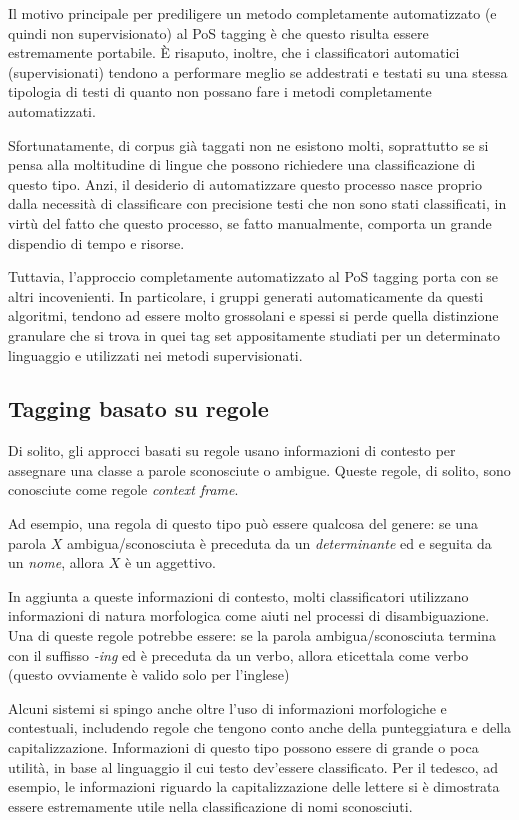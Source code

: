 Il motivo principale per prediligere un metodo completamente automatizzato (e quindi non supervisionato) al PoS tagging \`e che questo risulta essere estremamente portabile.
\`E risaputo, inoltre, che i classificatori automatici (supervisionati) tendono a performare meglio se addestrati e testati su una stessa tipologia di testi di quanto non possano fare i metodi completamente automatizzati.

Sfortunatamente, di corpus gi\`a taggati non ne esistono molti, soprattutto se si pensa alla moltitudine di lingue che possono richiedere una classificazione di questo tipo.
Anzi, il desiderio di automatizzare questo processo nasce proprio dalla necessit\`a di classificare con precisione testi che non sono stati classificati, in virt\`u del fatto che questo processo, se fatto manualmente, comporta un grande dispendio di tempo e risorse.

Tuttavia, l'approccio completamente automatizzato al PoS tagging porta con se altri incovenienti.
In particolare, i gruppi generati automaticamente da questi algoritmi, tendono ad essere molto grossolani e spessi si perde quella distinzione granulare che si trova in quei tag set appositamente studiati per un determinato linguaggio e utilizzati nei metodi supervisionati.

\subsection{Tagging basato su regole}
\nocite{Brill:1992}
\nocite{Greene:1971}

Di solito, gli approcci basati su regole usano informazioni di contesto per assegnare una classe a parole sconosciute o ambigue.
Queste regole, di solito, sono conosciute come regole \emph{context frame}.

Ad esempio, una regola di questo tipo pu\`o essere qualcosa del genere: se una parola $X$ ambigua/sconosciuta \`e preceduta da un \emph{determinante} ed e seguita da un \emph{nome}, allora $X$ \`e un aggettivo.

In aggiunta a queste informazioni di contesto, molti classificatori utilizzano informazioni di natura morfologica come aiuti nel processi di disambiguazione.
Una di queste regole potrebbe essere: se la parola ambigua/sconosciuta termina con il suffisso \emph{-ing} ed \`e preceduta da un verbo, allora eticettala come verbo (questo ovviamente \`e valido solo per l'inglese)

Alcuni sistemi si spingo anche oltre l'uso di informazioni morfologiche e contestuali, includendo regole che tengono conto anche della punteggiatura e della capitalizzazione.
Informazioni di questo tipo possono essere di grande o poca utilit\`a, in base al linguaggio il cui testo dev'essere classificato.
Per il tedesco, ad esempio, le informazioni riguardo la capitalizzazione delle lettere si \`e dimostrata essere estremamente utile nella classificazione di nomi sconosciuti.

